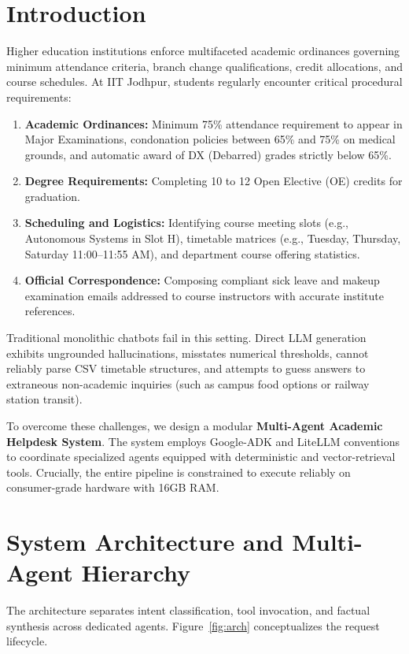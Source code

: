 \documentclass[10pt,a4paper]{article}
\begin{document}
\section{Introduction}
Higher education institutions enforce multifaceted academic ordinances governing minimum attendance criteria, branch change qualifications, credit allocations, and course schedules. At IIT Jodhpur, students regularly encounter critical procedural requirements:
\begin{enumerate}[noitemsep]
    \item \textbf{Academic Ordinances:} Minimum 75\% attendance requirement to appear in Major Examinations, condonation policies between 65\% and 75\% on medical grounds, and automatic award of DX (Debarred) grades strictly below 65\%.
    \item \textbf{Degree Requirements:} Completing 10 to 12 Open Elective (OE) credits for graduation.
    \item \textbf{Scheduling and Logistics:} Identifying course meeting slots (e.g., Autonomous Systems in Slot H), timetable matrices (e.g., Tuesday, Thursday, Saturday 11:00--11:55 AM), and department course offering statistics.
    \item \textbf{Official Correspondence:} Composing compliant sick leave and makeup examination emails addressed to course instructors with accurate institute references.
\end{enumerate}

Traditional monolithic chatbots fail in this setting. Direct LLM generation exhibits ungrounded hallucinations, misstates numerical thresholds, cannot reliably parse CSV timetable structures, and attempts to guess answers to extraneous non-academic inquiries (such as campus food options or railway station transit).

To overcome these challenges, we design a modular \textbf{Multi-Agent Academic Helpdesk System}. The system employs Google-ADK and LiteLLM conventions to coordinate specialized agents equipped with deterministic and vector-retrieval tools. Crucially, the entire pipeline is constrained to execute reliably on consumer-grade hardware with 16GB RAM.

\section{System Architecture and Multi-Agent Hierarchy}
The architecture separates intent classification, tool invocation, and factual synthesis across dedicated agents. Figure~\ref{fig:arch} conceptualizes the request lifecycle.
\end{document}
